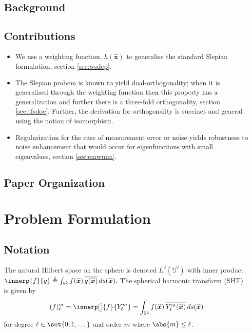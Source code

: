 \documentclass[10pt, twocolumn, twoside]{IEEEtran}
\newcommand{\untsph}{\mathbb{S}^{2}} %
\newcommand{\unit}[1]{\widehat{\bm{#1}}}
\newcommand{\dfn}{\triangleq}
\newcommand{\conj}[1]{\overline{#1}} %
\begin{document}
\subsection{Background}

\lipsum[4]

\subsection{Contributions}

\begin{itemize}
\item
We use a weighting function, $h(\unit{x})$ to generalise the standard Slepian formulation, section \ref{sec:wsdcp}.
\item
The Slepian probem is known to yield dual-orthogonality; when it is generalised through the weighting function then this property has a generalization and further there is a three-fold orthogonality, section \ref{sec:tfsdoe}.  Further, the derivation for orthogonality is succinct and general using the notion of isomorphism.
\item
Regularization for the case of measurement error or noise yields robustness to noise enhancement that would occur for eigenfunctions with small eigenvalues, section \ref{sec:emwuim}.
\end{itemize}

\subsection{Paper Organization}

\lipsum[13]

\section{Problem Formulation}

\subsection{Notation}

The natural Hilbert space on the sphere is denoted $L^2(\untsph)$ with inner product
\(
	\innerp{f}{g}\dfn\int_{\untsph} f(\unit{x})\,
		\conj{g(\unit{x})}\,ds(\unit{x}).
\)
The spherical harmonic transform (SHT) is given by
\[
	(f)_{\ell}^{m}=\innerp[\big]{f}{Y_{\ell}^{m}}
	=\int_{\untsph} f(\unit{x})\,\conj{Y_{\ell}^{m}(\unit{x})}\,ds(\unit{x})
\]
for degree $\ell\in\set{0,1,\dots}$ and order $m$ where $\abs{m}\leq \ell$.
\end{document}
